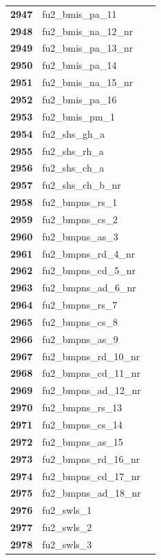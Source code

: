 \documentclass[
  letterpaper,
  DIV=11,
  numbers=noendperiod]{scrartcl}
\begin{document}
\begin{longtable}[t]{>{}cll}
\textbf{2947} & fu2\_bmis\_pa\_11 & \\
\textbf{2948} & fu2\_bmis\_na\_12\_nr & \\
\textbf{2949} & fu2\_bmis\_pa\_13\_nr & \\
\textbf{2950} & fu2\_bmis\_pa\_14 & \\
\addlinespace
\textbf{2951} & fu2\_bmis\_na\_15\_nr & \\
\textbf{2952} & fu2\_bmis\_pa\_16 & \\
\textbf{2953} & fu2\_bmis\_pm\_1 & \\
\textbf{2954} & fu2\_shs\_gh\_a & \\
\textbf{2955} & fu2\_shs\_rh\_a & \\
\addlinespace
\textbf{2956} & fu2\_shs\_ch\_a & \\
\textbf{2957} & fu2\_shs\_ch\_b\_nr & \\
\textbf{2958} & fu2\_bmpns\_rs\_1 & \\
\textbf{2959} & fu2\_bmpns\_cs\_2 & \\
\textbf{2960} & fu2\_bmpns\_as\_3 & \\
\addlinespace
\textbf{2961} & fu2\_bmpns\_rd\_4\_nr & \\
\textbf{2962} & fu2\_bmpns\_cd\_5\_nr & \\
\textbf{2963} & fu2\_bmpns\_ad\_6\_nr & \\
\textbf{2964} & fu2\_bmpns\_rs\_7 & \\
\textbf{2965} & fu2\_bmpns\_cs\_8 & \\
\addlinespace
\textbf{2966} & fu2\_bmpns\_as\_9 & \\
\textbf{2967} & fu2\_bmpns\_rd\_10\_nr & \\
\textbf{2968} & fu2\_bmpns\_cd\_11\_nr & \\
\textbf{2969} & fu2\_bmpns\_ad\_12\_nr & \\
\textbf{2970} & fu2\_bmpns\_rs\_13 & \\
\addlinespace
\textbf{2971} & fu2\_bmpns\_cs\_14 & \\
\textbf{2972} & fu2\_bmpns\_as\_15 & \\
\textbf{2973} & fu2\_bmpns\_rd\_16\_nr & \\
\textbf{2974} & fu2\_bmpns\_cd\_17\_nr & \\
\textbf{2975} & fu2\_bmpns\_ad\_18\_nr & \\
\addlinespace
\textbf{2976} & fu2\_swls\_1 & \\
\textbf{2977} & fu2\_swls\_2 & \\
\textbf{2978} & fu2\_swls\_3 & \\

\end{longtable}
\end{document}

